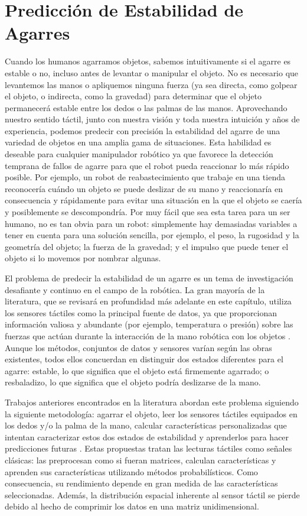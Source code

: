 \chapter{Predicción de Estabilidad de Agarres}

Cuando los humanos agarramos objetos, sabemos intuitivamente si el agarre es estable o no, incluso antes de levantar o manipular el objeto. No es necesario que levantemos las manos o apliquemos ninguna fuerza (ya sea directa, como golpear el objeto, o indirecta, como la gravedad) para determinar que el objeto permanecerá estable entre los dedos o las palmas de las manos. Aprovechando nuestro sentido táctil, junto con nuestra visión y toda nuestra intuición y años de experiencia, podemos predecir con precisión la estabilidad del agarre de una variedad de objetos en una amplia gama de situaciones. Esta habilidad es deseable para cualquier manipulador robótico ya que favorece la detección temprana de fallos de agarre para que el robot pueda reaccionar lo más rápido posible. Por ejemplo, un robot de reabastecimiento que trabaje en una tienda reconocería cuándo un objeto se puede deslizar de su mano y reaccionaría en consecuencia y rápidamente para evitar una situación en la que el objeto se caería y posiblemente se descompondría. Por muy fácil que sea esta tarea para un ser humano, no es tan obvia para un robot: simplemente hay demasiadas variables a tener en cuenta para una solución sencilla, por ejemplo, el peso, la rugosidad y la geometría del objeto; la fuerza de la gravedad; y el impulso que puede tener el objeto si lo movemos por nombrar algunas.

El problema de predecir la estabilidad de un agarre es un tema de investigación desafiante y continuo en el campo de la robótica. La gran mayoría de la literatura, que se revisará en profundidad más adelante en este capítulo, utiliza los sensores táctiles como la principal fuente de datos, ya que proporcionan información valiosa y abundante (por ejemplo, temperatura o presión) sobre las fuerzas que actúan durante la interacción de la mano robótica con los objetos \cite{Kappassov2015}. Aunque los métodos, conjuntos de datos y sensores varían según las obras existentes, todos ellos concuerdan en distinguir dos estados diferentes para el agarre: estable, lo que significa que el objeto está firmemente agarrado; o resbaladizo, lo que significa que el objeto podría deslizarse de la mano.

Trabajos anteriores encontrados en la literatura abordan este problema siguiendo la siguiente metodología: agarrar el objeto, leer los sensores táctiles equipados en los dedos y/o la palma de la mano, calcular características personalizadas que intentan caracterizar estos dos estados de estabilidad y aprenderlos para hacer predicciones futuras \cite{Li2014b,Dang2014,Su2015b,Veiga2015}. Estas propuestas tratan las lecturas táctiles como señales clásicas: las preprocesan como si fueran matrices, calculan características y aprenden sus características utilizando métodos probabilísticos. Como consecuencia, su rendimiento depende en gran medida de las características seleccionadas. Además, la distribución espacial inherente al sensor táctil se pierde debido al hecho de comprimir los datos en una matriz unidimensional.

